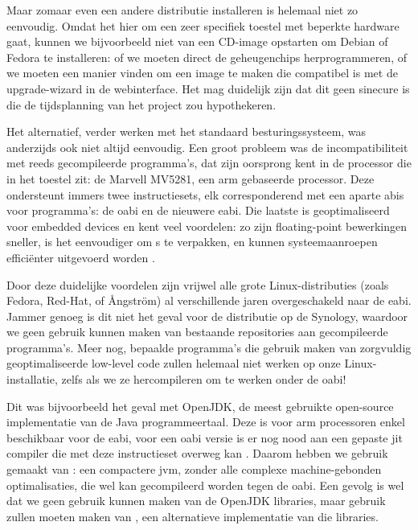 Maar zomaar even een andere distributie installeren is helemaal niet zo eenvoudig. Omdat het hier om een zeer specifiek toestel met beperkte hardware gaat, kunnen we bijvoorbeeld niet van een CD-image opstarten om Debian of Fedora te installeren: of we moeten direct de geheugenchips herprogrammeren, of we moeten een manier vinden om een image te maken die compatibel is met de upgrade-wizard in de webinterface. Het mag duidelijk zijn dat dit geen sinecure is die de tijdsplanning van het project zou hypothekeren.

Het alternatief, verder werken met het standaard besturingssysteem, was anderzijds ook niet altijd eenvoudig. Een groot probleem was de incompatibiliteit met reeds gecompileerde programma's, dat zijn oorsprong kent in de processor die in het toestel zit: de Marvell MV5281, een \ac{arm} gebaseerde processor. Deze ondersteunt immers twee instructiesets, elk corresponderend met een aparte \acp{abi} voor programma's: de \ac{oabi} en de nieuwere \ac{eabi}. Die laatste is geoptimaliseerd voor embedded devices en kent veel voordelen: zo zijn floating-point bewerkingen sneller, is het eenvoudiger om s te verpakken, en kunnen systeemaanroepen efficiënter uitgevoerd worden \citep{linuxfordevices:eabi}.

Door deze duidelijke voordelen zijn vrijwel alle grote Linux-distributies (zoals Fedora, Red-Hat, of Ångström) al verschillende jaren overgeschakeld naar de \ac{eabi}. Jammer genoeg is dit niet het geval voor de distributie op de Synology, waardoor we geen gebruik kunnen maken van bestaande repositories aan gecompileerde programma's. Meer nog, bepaalde programma's die gebruik maken van zorgvuldig geoptimaliseerde low-level code zullen helemaal niet werken op onze Linux-installatie, zelfs als we ze hercompileren om te werken onder de \ac{oabi}!

Dit was bijvoorbeeld het geval met OpenJDK, de meest gebruikte open-source implementatie van de Java programmeertaal. Deze is voor \ac{arm} processoren enkel beschikbaar voor de \ac{eabi}, voor een \ac{oabi} versie is er nog nood aan een gepaste \ac{jit} compiler die met deze instructieset overweg kan \citep{synology:java}. Daarom hebben we gebruik gemaakt van : een compactere \ac{jvm}, zonder alle complexe machine-gebonden optimalisaties, die wel kan gecompileerd worden tegen de \ac{oabi}. Een gevolg is wel dat we geen gebruik kunnen maken van de OpenJDK libraries, maar gebruik zullen moeten maken van , een alternatieve implementatie van die libraries.

